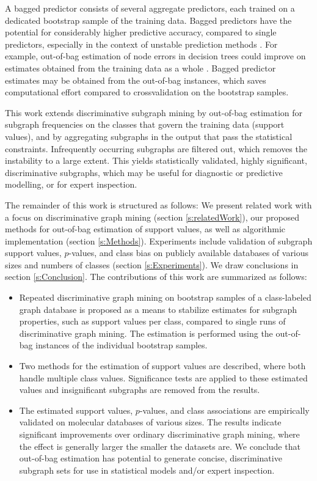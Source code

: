 \documentclass{sig-alternate}
\begin{document}
A bagged predictor consists of several aggregate predictors, each trained on a
dedicated bootstrap sample of the training data. Bagged predictors have the
potential for considerably higher predictive accuracy, compared to single
predictors, especially in the context of unstable prediction methods
\cite{breiman96oob}. For example, out-of-bag estimation of node errors in
decision trees could improve on estimates obtained from the training data as a
whole \cite{breiman96oob}. Bagged predictor estimates may be obtained from the out-of-bag
instances, which saves computational effort compared to crossvalidation on the
bootstrap samples. 

This work extends discriminative subgraph mining by out-of-bag estimation for
subgraph frequencies on the classes that govern the
training data (support values), and by aggregating subgraphs in the output that pass the
statistical constraints.  Infrequently occurring subgraphs are filtered out, 
which removes the instability to a large extent. This yields statistically validated, highly significant,
discriminative subgraphs, which may be useful for diagnostic or predictive
modelling, or for expert inspection. 

The remainder of this work is structured as follows: We present related work
with a focus on discriminative graph mining (section \ref{s:relatedWork}), our
proposed methods for out-of-bag estimation of support values, as
well as algorithmic implementation (section \ref{s:Methods}).
Experiments include validation of subgraph support
values, $p$-values, and class bias on publicly available databases of
various sizes and numbers of classes (section \ref{s:Experiments}).
We draw conclusions in section \ref{s:Conclusion}.
The contributions of this work are summarized as follows:
\begin{itemize}
  \item Repeated discriminative graph mining on bootstrap samples of a
    class-labeled graph database is proposed as a means to stabilize estimates
    for subgraph properties, such as support values per class, compared to
    single runs of discriminative graph mining. The estimation is performed
    using the out-of-bag instances of the individual bootstrap samples.
  \item Two methods for the estimation of support values are described, where both
    handle multiple class values. Significance tests are applied to these
    estimated values and insignificant subgraphs are removed from the results.  
  \item The estimated support values, $p$-values, and class
    associations are empirically validated on molecular databases of various
    sizes.  The results indicate significant improvements over 
    ordinary discriminative graph mining, where the effect is generally larger the
    smaller the datasets are.  We conclude that out-of-bag estimation has 
    potential to generate concise, discriminative subgraph sets for
    use in statistical models and/or expert inspection.
\end{itemize}
\end{document}
